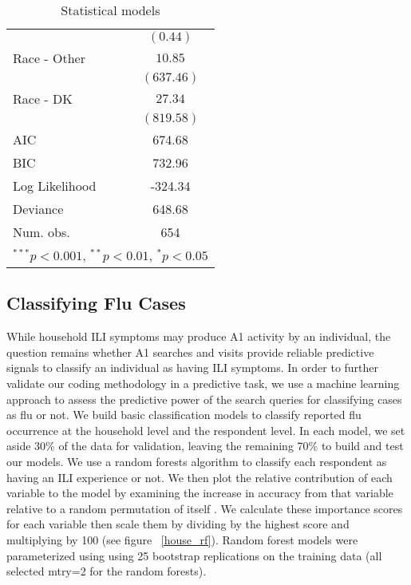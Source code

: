 \documentclass[12pt]{article}
\begin{document}
\begin{table}
\begin{center}
\begin{tabular}{l c }
                       & $(0.44)$       \\
Race - Other              & $10.85$        \\
                       & $(637.46)$     \\
Race - DK                 & $27.34$        \\
                       & $(819.58)$     \\
\hline
AIC                    & 674.68         \\
BIC                    & 732.96         \\
Log Likelihood         & -324.34        \\
Deviance               & 648.68         \\
Num. obs.              & 654            \\
\hline
\multicolumn{2}{l}{\scriptsize{$^{***}p<0.001$, $^{**}p<0.01$, $^*p<0.05$}}
\end{tabular}
\caption{Statistical models}
\label{table:race_coefficients}
\end{center}
\end{table}

\subsection{Classifying Flu Cases}

While household ILI symptoms may produce A1 activity by an individual, the question remains whether A1 searches and visits provide reliable predictive signals to classify an individual as having ILI symptoms. In order to further validate our coding methodology in a predictive task, we use a machine learning approach to assess the predictive power of the search queries for classifying cases as flu or not. We build basic classification models to classify reported flu occurrence at the household level and the respondent level. In each model, we set aside 30\% of the data for validation, leaving the remaining 70\% to build and test our models. We use a random forests algorithm to classify each respondent as having an ILI experience or not. We then plot the relative contribution of each variable to the model by examining the increase in accuracy from that variable relative to a random permutation of itself \citet{breiman_2001random}. We calculate these importance scores for each variable then scale them by dividing by the highest score and multiplying by 100 \citep{kuhn_2008, kuhn_and_johnson_2013} (see figure ~\ref{house_rf}). Random forest models were parameterized using using 25 bootstrap replications on the training data (all selected mtry=2 for the random forests).
\end{document}
